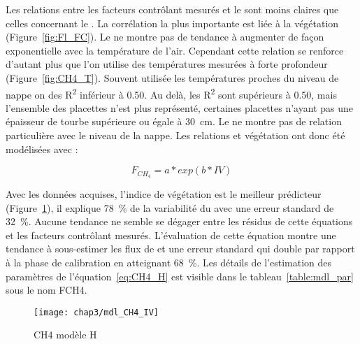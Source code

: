 Les relations entre les facteurs contrôlant mesurés et le \chh sont moins claires que celles concernant le \coo.
La corrélation la plus importante est liée à la végétation (Figure~\ref{fig:Fl_FC}).
Le \chh ne montre pas de tendance à augmenter de façon exponentielle avec la température de l'air.
Cependant cette relation se renforce d'autant plus que l'on utilise des températures mesurées à forte profondeur (Figure~\ref{fig:CH4_T}).
Souvent utilisée les températures proches du niveau de nappe on des R\textsuperscript{2} inférieur à \num{0.50}.
Au delà, les R\textsuperscript{2} sont supérieurs à \num{0.50}, mais l'ensemble des placettes n'est plus représenté, certaines placettes n'ayant pas une épaisseur de tourbe supérieure ou égale à \SI{30}{\centi\metre}.
Le \chh ne montre pas de relation particulière avec le niveau de la nappe.
Les relations \chh et végétation ont donc été modélisées avec :

\begin{equation} \label{eq:CH4_H}
F_{CH_{4}} = a*exp(b*IV)
\end{equation}

Avec les données acquises, l'indice de végétation est le meilleur prédicteur (Figure~\ref{fig:CH4_mdl}), il explique \SI{78}{\percent} de la variabilité du \chh avec une erreur standard de \SI{32}{\percent}.
Aucune tendance ne semble se dégager entre les résidus de cette équations et les facteurs contrôlant mesurés.
L'évaluation de cette équation montre une tendance à sous-estimer les flux de \chh et une erreur standard qui double par rapport à la phase de calibration en atteignant \SI{68}{\percent}.
Les détails de l'estimation des paramètres de l'équation~\ref{eq:CH4_H} est visible dans le tableau~\ref{table:mdl_par} sous le nom FCH4.

\begin{figure}
\centering
\texttt{[image: chap3/mdl\_CH4\_IV]}
\caption{CH4 modèle H}
\label{fig:CH4_mdl}
\end{figure}

